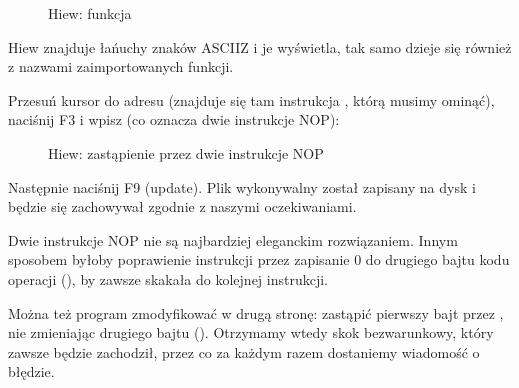 \begin{figure}[H]
\centering
{}
\caption{Hiew: funkcja \main}
\label{fig:scanf_ex3_hiew_1}
\end{figure}

Hiew znajduje łańuchy znaków \ac{ASCIIZ} i je wyświetla, tak samo dzieje się również z nazwami zaimportowanych funkcji.

\clearpage
Przesuń kursor do adresu  (znajduje się tam instrukcja , którą musimy ominąć), naciśnij F3 i wpisz  (co oznacza dwie instrukcje \ac{NOP}):

\begin{figure}[H]
\centering
{}
\caption{Hiew: zastąpienie  przez dwie instrukcje \ac{NOP}}
\label{fig:scanf_ex3_hiew_2}
\end{figure}

Następnie naciśnij F9 (update). Plik wykonywalny został zapisany na dysk i będzie się zachowywał zgodnie z naszymi oczekiwaniami.

Dwie instrukcje \ac{NOP} nie są najbardziej eleganckim rozwiązaniem.
Innym sposobem byłoby poprawienie instrukcji przez zapisanie 0 do drugiego bajtu kodu operacji (),
by  zawsze skakała do kolejnej instrukcji.

Można też program zmodyfikować w drugą stronę: zastąpić pierwszy bajt przez , nie zmieniając drugiego bajtu ().
Otrzymamy wtedy skok bezwarunkowy, który zawsze będzie zachodził, przez co za każdym razem dostaniemy wiadomość o błędzie.
